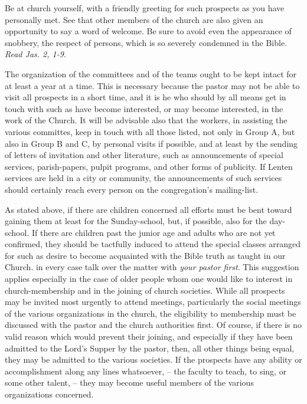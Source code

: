 \documentclass[
]{book}
\begin{document}
Be at church yourself, with a friendly greeting for such prospects as you have personally met. See that other members of the church are also given an opportunity to say a word of welcome. Be sure to avoid even the appearance of snobbery, the respect of persons, which is so severely condemned in the Bible. \emph{Read Jas. 2, 1-9}.

The organization of the committees and of the teams ought to be kept intact for at least a year at a time. This is necessary because the pastor may not be able to visit all prospects in a short time, and it is he who should by all means get in touch with such as have become interested, or may become interested, in the work of the Church. It will be advisable also that the workers, in assisting the various committes, keep in touch with all those listed, not only in Group A, but also in Group B and C, by personal visits if possible, and at least by the sending of letters of invitation and other literature, such as announcements of special services, parish-papers, pulpit programs, and other forms of publicity. If Lenten services are held in a city or community, the announcements of such services should certainly reach every person on the congregation's mailing-list.

As stated above, if there are children concerned all efforts must be bent toward gaining them at least for the Sunday-school, but, if possible, also for the day-school. If there are children past the junior age and adults who are not yet confirmed, they should be tactfully induced to attend the special classes arranged for such as desire to become acquainted with the Bible truth as taught in our Church. in every case talk over the matter with \emph{your pastor first}. This suggestion applies especially in the case of older people whom one would like to interest in church-membership and in the joining of church societies. While all prospects may be invited most urgently to attend meetings, particularly the social meetings of the various organizations in the church, the eligibility to membership must be discussed with the pastor and the church authorities first. Of course, if there is no valid reason which would prevent their joining, and especially if they have been admitted to the Lord's Supper by the pastor, then, all other things being equal, they may be admitted to the various societies. If the prospects have any ability or accomplishment along any lines whatsoever, -- the faculty to teach, to sing, or some other talent, -- they may become useful members of the various organizations concerned.
\end{document}
